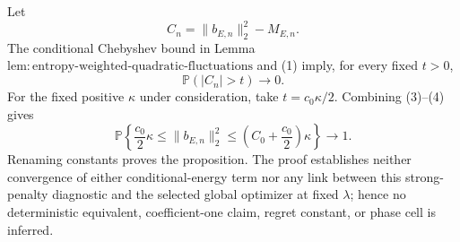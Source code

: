 Let
\[
 C_n=\|b_{E,n}\|_2^2-M_{E,n}.
\]
The conditional Chebyshev bound in Lemma \(\mathrm{lem{:}entropy\mbox{-}weighted\mbox{-}quadratic\mbox{-}fluctuations}\) and (1) imply, for every fixed \(t>0\),
\[
 \mathbb P(|C_n|>t)\to0.
 \tag{4}
\]
For the fixed positive \(\kappa\) under consideration, take \(t=c_0\kappa/2\).  Combining (3)--(4) gives
\[
 \mathbb P\!\left\{
 \frac{c_0}2\kappa\le\|b_{E,n}\|_2^2
 \le\left(C_0+\frac{c_0}2\right)\kappa
 \right\}\to1.
\]
Renaming constants proves the proposition.  The proof establishes neither convergence of either conditional-energy term nor any link between this strong-penalty diagnostic and the selected global optimizer at fixed \(\lambda\); hence no deterministic equivalent, coefficient-one claim, regret constant, or phase cell is inferred.
